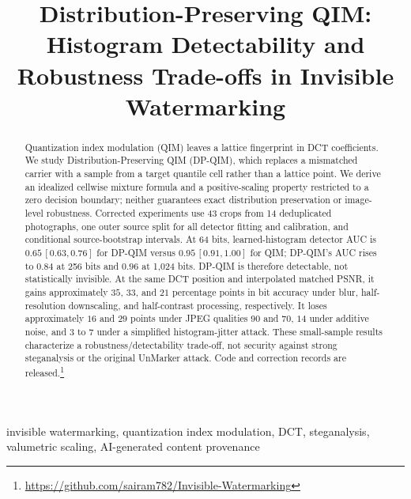 \documentclass[conference,10pt]{IEEEtran}
\begin{document}
\title{Distribution-Preserving QIM: Histogram Detectability
and Robustness Trade-offs in Invisible Watermarking}

\author{
}

\maketitle

\begin{abstract}
Quantization index modulation (QIM) leaves a lattice fingerprint in DCT
coefficients. We study Distribution-Preserving QIM (DP-QIM), which replaces
a mismatched carrier with a sample from a target quantile cell rather than
a lattice point. We derive an idealized cellwise mixture formula and a
positive-scaling property restricted to a zero decision boundary; neither
guarantees exact distribution preservation or image-level robustness.
Corrected experiments use 43 crops from 14 deduplicated photographs, one
outer source split for all detector fitting and calibration, and conditional
source-bootstrap intervals. At 64 bits, learned-histogram detector AUC is
$0.65\,[0.63,0.76]$ for DP-QIM versus $0.95\,[0.91,1.00]$ for QIM; DP-QIM's
AUC rises to $0.84$ at 256 bits and $0.96$ at 1,024 bits. DP-QIM is therefore
detectable, not statistically invisible. At the same DCT position and
interpolated matched PSNR, it gains approximately $35$, $33$, and $21$
percentage points in bit accuracy under blur, half-resolution downscaling,
and half-contrast processing, respectively. It loses approximately $16$ and
$29$ points under JPEG qualities 90 and 70, $14$ under additive noise, and
$3$ to $7$ under a simplified histogram-jitter attack. These small-sample
results characterize a robustness/detectability trade-off, not security
against strong steganalysis or the original UnMarker attack. Code and
correction records are released.\footnote{\url{https://github.com/sairam782/Invisible-Watermarking}}
\end{abstract}

\begin{IEEEkeywords}
invisible watermarking, quantization index modulation, DCT, steganalysis,
valumetric scaling, AI-generated content provenance
\end{IEEEkeywords}
\end{document}
